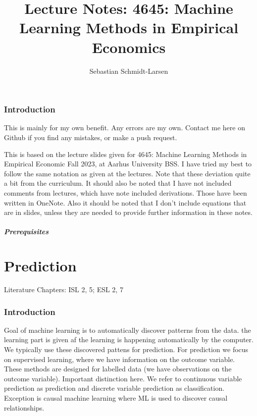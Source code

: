 \documentclass[11pt,a4paper]{article}
\begin{document}
  

\title{Lecture Notes: 4645: Machine Learning Methods in Empirical Economics}
\author{Sebastian Schmidt-Larsen}
\maketitle

\section{Introduction}

This is mainly for my own benefit. Any errors are my own. Contact me here on Github if you find any mistakes, or make a push request.

This is based on the lecture slides given for 4645: Machine Learning Methods in Empirical Economic Fall 2023, at Aarhus University BSS.
I have tried my best to follow the same notation as given at the lectures. Note that these deviation quite a bit from the curriculum.
It should also be noted that I have not included comments from lectures, which have note included derivations. Those have been written in OneNote.
Also it should be noted that I don't include equations that are in slides, unless they are needed to provide further information in these notes.



\subsubsection*{Prerequisites}

\part{Prediction}

Literature Chapters: ISL 2, 5; ESL 2, 7

\section{Introduction}

Goal of machine learning is to automatically discover patterns from the data.
the learning part is given af the learning is happening automatically by the computer.
We  typically use these discovered pattens for prediction.
\newline
For prediction we focus on supervised learning, where we have information on the outcome variable. These methods are designed  for labelled data (we have observations on the outcome variable). 
\newline 
Important distinction here. We refer to continuous variable prediction as prediction and discrete variable prediction as classification. Exception is causal machine learning where ML is used to discover causal relationships.
\end{document}
